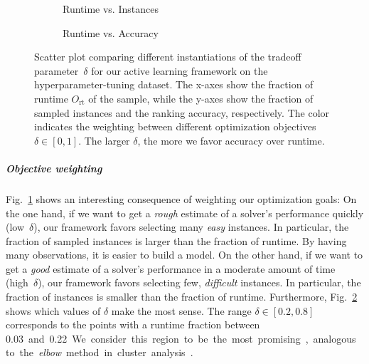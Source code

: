 \documentclass[sn-basic, Numbered]{sn-jnl} %
\begin{document}
\begin{figure}[tb!]
  \centering
  \begin{subfigure}{0.4775\textwidth}
    \caption{Runtime vs. Instances}
    \label{fig:annitrainoptgoalruntime}
  \end{subfigure}
  \begin{subfigure}{0.5125\textwidth}
    \caption{Runtime vs. Accuracy}
    \label{fig:annitrainoptgoalacc}
  \end{subfigure}

  \caption{
    Scatter plot comparing different instantiations of the tradeoff parameter~$\delta$ for our active learning framework on the hyperparameter-tuning dataset.
    The x-axes show the fraction of runtime $O_{\operatorname{rt}}$ of the sample, while the y-axes show the fraction of sampled instances and the ranking accuracy, respectively.
    The color indicates the weighting between different optimization objectives $\delta \in \left[0, 1\right]$.
    The larger $\delta$, the more we favor accuracy over runtime.
  }
  \label{fig:annitrainoptgoal}
\end{figure}

\subparagraph{Objective weighting}

Fig.~\ref{fig:annitrainoptgoalruntime} shows an interesting consequence of weighting our optimization goals:
On the one hand, if we want to get a \emph{rough} estimate of a solver's performance quickly (low~$\delta$), our framework favors selecting many \emph{easy} instances.
In particular, the fraction of sampled instances is larger than the fraction of runtime.
By having many observations, it is easier to build a model.
On the other hand, if we want to get a \emph{good} estimate of a solver's performance in a moderate amount of time (high~$\delta$), our framework favors selecting few, \emph{difficult} instances.
In particular, the fraction of instances is smaller than the fraction of runtime.
Furthermore, Fig.~\ref{fig:annitrainoptgoalacc} shows which values of $\delta$ make the most sense.
The range $\delta \in \left[0.2, 0.8\right]$ corresponds to the points with a runtime fraction between \SI{0.03} and \SI{0.22}.
We consider this region to be the most promising, analogous to the \emph{elbow} method in cluster analysis~\cite{kodinariya2013review}.
\end{document}
